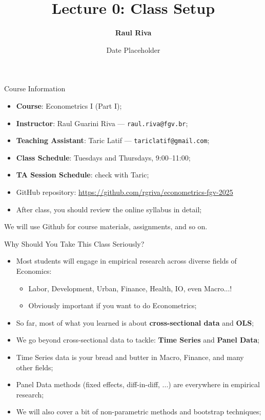 \documentclass[aspectratio=169, xcolor=dvipsnames, 12pt]{beamer}
\title[]{Lecture 0: Class Setup}
\author{\textbf{Raul Riva}}
\institute{\scriptsize \textcolor{FGVBlue}{FGV EPGE}}
\date{Date Placeholder}
\begin{document}
\begin{frame}[plain]
  \titlepage
\end{frame}

\begin{frame}{Course Information}
  \begin{itemize}
    \item \textbf{Course}: Econometrics I (Part I);
    \item \textbf{Instructor}: Raul Guarini Riva — \texttt{raul.riva@fgv.br};
    \item \textbf{Teaching Assistant}: Taric Latif — \texttt{tariclatif@gmail.com};
    \item \textbf{Class Schedule}: Tuesdays and Thursdays, 9:00–11:00;
    \item \textbf{TA Session Schedule}: check with Taric;
    \item GitHub repository: \url{https://github.com/rgriva/econometrics-fgv-2025}
    \item After class, you should review the online syllabus in detail;
  \end{itemize}
  \vspace{1em}
  \centering
  \alert{We will use Github for course materials, assignments, and so on.}
\end{frame}

\begin{frame}{Why Should You Take This Class Seriously?}
  \begin{itemize}
    \item Most students will engage in empirical research across diverse fields of Economics:
      \begin{itemize}
        \item Labor, Development, Urban, Finance, Health, IO, even Macro...!
        \item Obviously important if you want to do Econometrics;
      \end{itemize}
    \item So far, most of what you learned is about \textbf{cross-sectional data} and \textbf{OLS};
    \item We go beyond cross-sectional data to tackle: \textbf{Time Series} and \textbf{Panel Data};
    \item Time Series data is your bread and butter in Macro, Finance, and many other fields;
    \item Panel Data methods (fixed effects, diff-in-diff, ...) are everywhere in empirical research;
    \item We will also cover a bit of non-parametric methods and bootstrap techniques;
  \end{itemize}
\end{frame}
\end{document}
